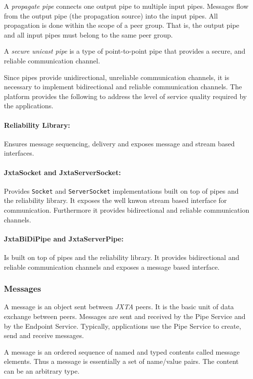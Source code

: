 A \emph{propagate pipe} connects one output pipe to multiple input pipes. Messages flow from the output pipe (the propagation source) into the input pipes. All propagation is done within the scope of a peer group. That is, the output pipe and all input pipes must belong to the same peer group. 

A \emph{secure unicast pipe} is a type of point-to-point pipe that provides a secure, and reliable communication channel. 

Since pipes provide unidirectional, unreliable communication channels, it is necessary to implement bidirectional and reliable communication channels. The platform provides the following to address the level of service quality required by the applications.

\paragraph{Reliability Library:} Ensures message sequencing, delivery and exposes message and stream based interfaces.
\paragraph{JxtaSocket and JxtaServerSocket:} Provides \texttt{Socket} and \texttt{ServerSocket} implementations built on top of pipes and the reliability library. It exposes the well knwon stream based interface for communication. Furthermore it provides bidirectional and reliable communication channels.
\paragraph{JxtaBiDiPipe and JxtaServerPipe:} Is built on top of pipes and the reliability library. It provides bidirectional and reliable communication channels and exposes a message based interface.

\subsubsection{Messages}
A message is an object sent between \emph{JXTA} peers. It is the basic unit of data exchange between peers. Messages are sent and received by the Pipe Service and by the Endpoint Service. Typically, applications use the Pipe Service to create, send and receive messages. 

A message is an ordered sequence of named and typed contents called message elements. Thus a message is essentially a set of name/value pairs. The content can be an arbitrary type. 

